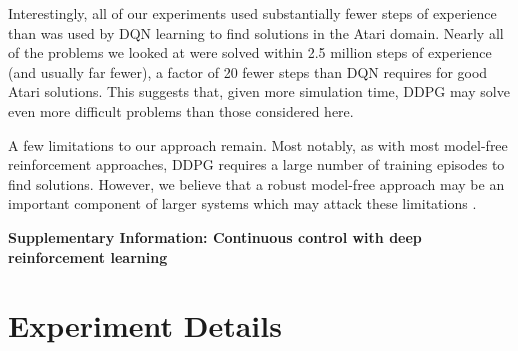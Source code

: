 \documentclass{article} %
\begin{document}
Interestingly, all of our experiments used substantially fewer steps
of experience than was used by DQN learning to find solutions in the
Atari domain.  Nearly all of the problems we looked at were solved
within 2.5 million steps of experience (and usually far fewer), a
factor of 20 fewer steps than DQN requires for good Atari solutions.
This suggests that, given more simulation time, DDPG may solve
even more difficult problems than those considered here.

A few limitations to our approach remain. Most notably, as with most
model-free reinforcement approaches, DDPG requires a large number of
training episodes to find solutions. However, we believe that a robust
model-free approach may be an important component of larger systems
which may attack these limitations \citep{glascher2010states}.

%








\newpage

\begin{center}
{\LARGE\bf Supplementary Information: Continuous control with deep
  reinforcement learning}
\end{center}

\section{Experiment Details}
\end{document}
